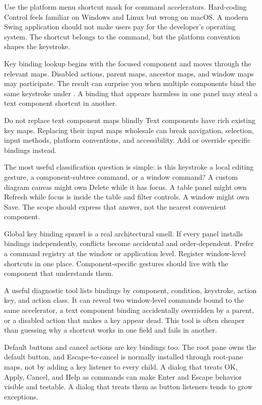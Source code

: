 Use the platform menu shortcut mask for command accelerators. Hard-coding Control feels familiar on Windows and Linux but wrong on macOS. A modern Swing application should not make users pay for the developer's operating system. The shortcut belongs to the command, but the platform convention shapes the keystroke.

Key binding lookup begins with the focused component and moves through the relevant maps. Disabled actions, parent maps, ancestor maps, and window maps may participate. The result can surprise you when multiple components bind the same keystroke under . A binding that appears harmless in one panel may steal a text component shortcut in another.

\begin{detailbox}{Do not replace text component maps blindly}
Text components have rich existing key maps. Replacing their input maps wholesale can break navigation, selection, input methods, platform conventions, and accessibility. Add or override specific bindings instead.
\end{detailbox}

The most useful classification question is simple: is this keystroke a local editing gesture, a component-subtree command, or a window command? A custom diagram canvas might own Delete while it has focus. A table panel might own Refresh while focus is inside the table and filter controls. A window might own Save. The scope should express that answer, not the nearest convenient component.

Global key binding sprawl is a real architectural smell. If every panel installs  bindings independently, conflicts become accidental and order-dependent. Prefer a command registry at the window or application level. Register window-level shortcuts in one place. Component-specific gestures should live with the component that understands them.

A useful diagnostic tool lists bindings by component, condition, keystroke, action key, and action class. It can reveal two window-level commands bound to the same accelerator, a text component binding accidentally overridden by a parent, or a disabled action that makes a key appear dead. This tool is often cheaper than guessing why a shortcut works in one field and fails in another.

Default buttons and cancel actions are key bindings too. The root pane owns the default button, and Escape-to-cancel is normally installed through root-pane maps, not by adding a key listener to every child. A dialog that treats OK, Apply, Cancel, and Help as commands can make Enter and Escape behavior visible and testable. A dialog that treats them as button listeners tends to grow exceptions.

